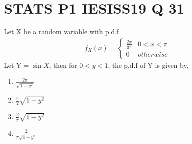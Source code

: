 \documentclass[journal,12pt,twocolumn]{IEEEtran}
\begin{document}
\section*{STATS P1 IESISS19 Q 31}
Let X be a random variable with p.d.f
\begin{align}
    f_{X}(x)=\begin{cases} 
            \frac{2x}{\pi^2}  &  0<x<\pi\\
            0 & otherwise
            \end{cases} 
\end{align}
Let Y = $\sin{X}$, then for $0<y<1$, the p.d.f of Y is given by,\\
\begin{enumerate}[label = (\Alph*)]
    \item  $\frac{2\pi}{\sqrt{1-y^2}}$\\
    \item  $\frac{\pi}{2}\sqrt{1-y^2}$\\
    \item  $\frac{2}{\pi}\sqrt{1-y^2}$\\
    \item  $\frac{2}{\pi\sqrt{1-y^2}}$
\end{enumerate}
\end{document}
